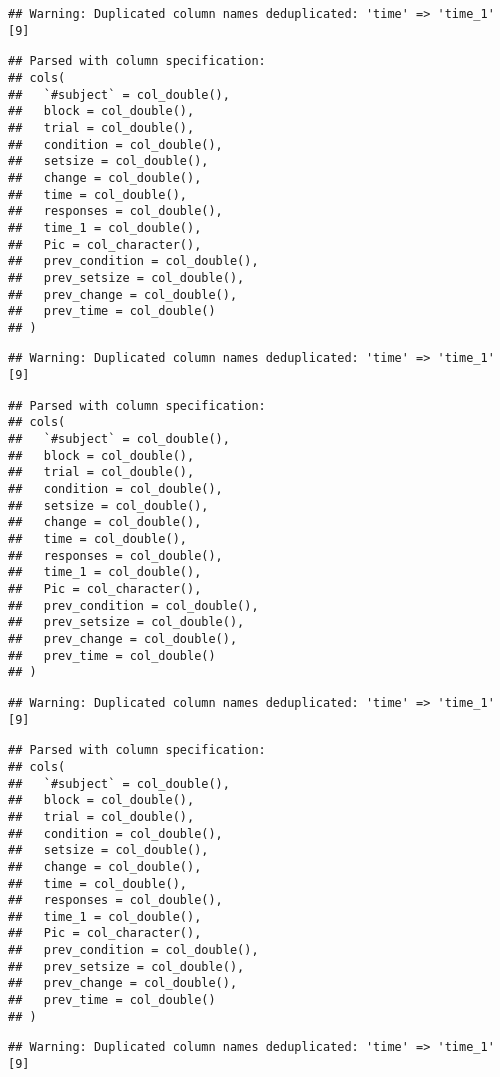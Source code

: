 \documentclass[
]{article}
\begin{document}
\begin{verbatim}
## Warning: Duplicated column names deduplicated: 'time' => 'time_1' [9]
\end{verbatim}

\begin{verbatim}
## Parsed with column specification:
## cols(
##   `#subject` = col_double(),
##   block = col_double(),
##   trial = col_double(),
##   condition = col_double(),
##   setsize = col_double(),
##   change = col_double(),
##   time = col_double(),
##   responses = col_double(),
##   time_1 = col_double(),
##   Pic = col_character(),
##   prev_condition = col_double(),
##   prev_setsize = col_double(),
##   prev_change = col_double(),
##   prev_time = col_double()
## )
\end{verbatim}

\begin{verbatim}
## Warning: Duplicated column names deduplicated: 'time' => 'time_1' [9]
\end{verbatim}

\begin{verbatim}
## Parsed with column specification:
## cols(
##   `#subject` = col_double(),
##   block = col_double(),
##   trial = col_double(),
##   condition = col_double(),
##   setsize = col_double(),
##   change = col_double(),
##   time = col_double(),
##   responses = col_double(),
##   time_1 = col_double(),
##   Pic = col_character(),
##   prev_condition = col_double(),
##   prev_setsize = col_double(),
##   prev_change = col_double(),
##   prev_time = col_double()
## )
\end{verbatim}

\begin{verbatim}
## Warning: Duplicated column names deduplicated: 'time' => 'time_1' [9]
\end{verbatim}

\begin{verbatim}
## Parsed with column specification:
## cols(
##   `#subject` = col_double(),
##   block = col_double(),
##   trial = col_double(),
##   condition = col_double(),
##   setsize = col_double(),
##   change = col_double(),
##   time = col_double(),
##   responses = col_double(),
##   time_1 = col_double(),
##   Pic = col_character(),
##   prev_condition = col_double(),
##   prev_setsize = col_double(),
##   prev_change = col_double(),
##   prev_time = col_double()
## )
\end{verbatim}

\begin{verbatim}
## Warning: Duplicated column names deduplicated: 'time' => 'time_1' [9]
\end{verbatim}
\end{document}
